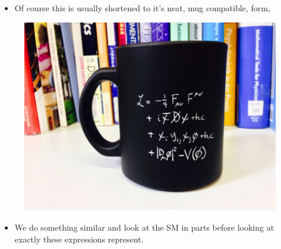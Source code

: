 \documentclass[10pt,xcolor=dvipsnames,mathserif]{beamer}
\begin{document}
\begin{frame}
	\begin{itemize}
		\item Of course this is usually shortened to it's neat, mug compatible, form,
	\end{itemize}
	\begin{figure}
		\includegraphics[width=0.65\linewidth,keepaspectratio]{SM/SM_Lagrangian_Mug.png}
	\end{figure}
	\begin{itemize}
	\item We do something similar and look at the SM in parts before looking at exactly these expressions represent.
\end{itemize}
\end{frame}
\end{document}

